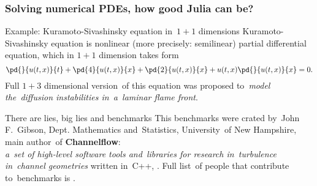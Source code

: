 \documentclass{beamer}  %
\begin{document}
\begin{frame}
  \frametitle{Solving numerical PDEs, how good Julia can be?}

  \begin{block}{Example: Kuramoto-Sivashinsky equation in~$1 + 1$ dimensions}
    Kuramoto-Sivashinsky equation is nonlinear (more precisely:
    semilinear) partial differential equation, which in $1 + 1$
    dimension takes form
    \begin{equation}
      \label{eq:1}
      \pd{ }{ u( t, x ) }{ t } + \pd{ 4 }{ u( t, x ) }{ x }
      + \pd{ 2 }{ u( t, x ) }{ x } + u( t, x ) \pd{ }{ u( t, x ) }{ x }
      = 0.
    \end{equation}
    Full $1 + 3$ dimensional version~of this equation was proposed
    to~\emph{model the~diffusion instabilities in~a~laminar flame
      front}.
  \end{block}

  \begin{block}{There are lies, big lies and benchmarks}
    This benchmarks were crated by~John F.~Gibson, Dept. Mathematics
    and~Statistics, University~of New Hampshire, main author~of
    \textbf{Channelflow}: \\
    \emph{a~set of high-level software tools and~libraries for
      research in~turbulence in~channel geometries} written in~C++,
    . Full list~of people that
    contribute to~benchmarks is
    .
  \end{block}

\end{frame}
\end{document}
